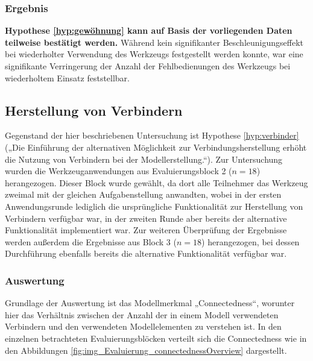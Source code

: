 \subsubsection{Ergebnis} 

\textbf{Hypothese \ref{hyp:gewöhnung} kann auf Basis der vorliegenden Daten teilweise bestätigt werden.} Während kein signifikanter Beschleunigungseffekt bei wiederholter Verwendung des Werkzeugs festgestellt werden konnte, war eine signifikante Verringerung der Anzahl der Fehlbedienungen des Werkzeugs bei wiederholtem Einsatz feststellbar.


\subsection{Herstellung von Verbindern} %
\label{sub:herstellung_von_verbindern}

Gegenstand der hier beschriebenen Untersuchung ist Hypothese \ref{hyp:verbinder} („Die Einführung der alternativen Möglichkeit zur Verbindungsherstellung erhöht die Nutzung von Verbindern bei der Modellerstellung.“). Zur Untersuchung wurden die Werkzeuganwendungen aus Evaluierungsblock 2 ($n=18$) herangezogen. Dieser Block wurde gewählt, da dort alle Teilnehmer das Werkzeug zweimal mit der gleichen Aufgabenstellung anwandten, wobei in der ersten Anwendungsrunde lediglich die ursprüngliche Funktionalität zur Herstellung von Verbindern verfügbar war, in der zweiten Runde aber bereits der alternative Funktionalität implementiert war. Zur weiteren Überprüfung der Ergebnisse werden außerdem die Ergebnisse aus Block 3 ($n=18$) herangezogen, bei dessen Durchführung ebenfalls bereits die alternative Funktionalität verfügbar war.

\subsubsection{Auswertung} %

Grundlage der Auswertung ist das Modellmerkmal „Connectedness“, worunter hier das Verhältnis zwischen der Anzahl der in einem Modell verwendeten Verbindern und den verwendeten Modellelementen zu verstehen ist. In den einzelnen betrachteten Evaluierungsblöcken verteilt sich die Connectedness wie in den Abbildungen \ref{fig:img_Evaluierung_connectednessOverview} dargestellt.

